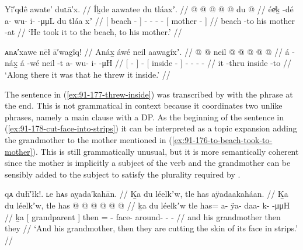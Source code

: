 

\ex\label{ex:91-176-to-beach-took-to-mother}%
%
\begingl
	\glpreamble	Yî′qdê awate′ duʟā′x. //
	\glpreamble	Íḵde aawatee du tláaxʼ. //
	\gla	{}  @ {} {}
		 @ {} @ {} @ {} @ {}
		{} du  @ {} {} //
	\glb	{} éeͥḵ -dé {} a- wu- i-  -μμL
		{} du tláa xʼ {} //
	\glc	{}[  beach - {}]
		- - -  -
		{}[  mother - {}] //
	\gld	{} beach -to {}
		 {} {} {} {}
		{} his mother -at {} //
	\glft	‘He took it to the beach, to his mother.’
		//
\endgl
\xe

\ex\label{ex:91-177-threw-inside}%
%
\begingl
	\glpreamble	ᴀnᴀ′xawe nēł ā′wagîq! //
	\glpreamble	Anáx̱ áwé neil aawag̱íxʼ. //
	\gla	{}  @ {} {}  @ {}
		{} neil @ {} {}
		 @ {} @ {} @ {} @ {} //
	\glb	{} á -náx̱ {} á -wé
		{} neil -t {}
		a- wu- i-  -μH //
	\glc	{}[  - {}]  -
		{}[ inside - {}]
		- - -  - //
	\gld	{} it -thru {}  {}
		{} inside -to {}
		 {} {} {} {} //
	\glft	‘Along there it was that he threw it inside.’
		//
\endgl
\xe

The sentence in (\ref{ex:91-177-threw-inside}) was transcribed by \citeauthor{swanton:1909} with the phrase   at the end.
This is not grammatical in context because it coordinates two unlike phrases, namely a main clause with a DP.
As the beginning of the sentence in (\ref{ex:91-178-cut-face-into-strips}) it can be interpreted as a topic expansion adding the grandmother to the mother mentioned in (\ref{ex:91-176-to-beach-took-to-mother}).
This is still grammatically unusual, but it is more semantically coherent since the mother is implicitly a subject of the verb  and the grandmother can be sensibly added to the subject to satisfy the plurality required by .

\ex\label{ex:91-178-cut-face-into-strips}%
%
\begingl
	\glpreamble	qᴀ dułī′łk!. ʟe hᴀs aỵada′kahān. //
	\glpreamble	Ḵa du léelkʼw, tle has aÿadaakaháan. //
	\gla	Ḵa {} du léelkʼw, {} tle has @  @ {} @ {} @ {} @ {} @ {} //
	\glb	ḵa {} du léelkʼw {}
		tle has= a- ÿa- daa- k-  -μμH //
	\glc	ḵa {}[  grandparent {}]
		then =
			- face- around- -  - //
	\gld	and {} his grandmother {}
		then they
			 {} {} {} {} {} //
	\glft	‘And his grandmother, then they are cutting the skin of its face in strips.’
		//
\endgl
\xe

